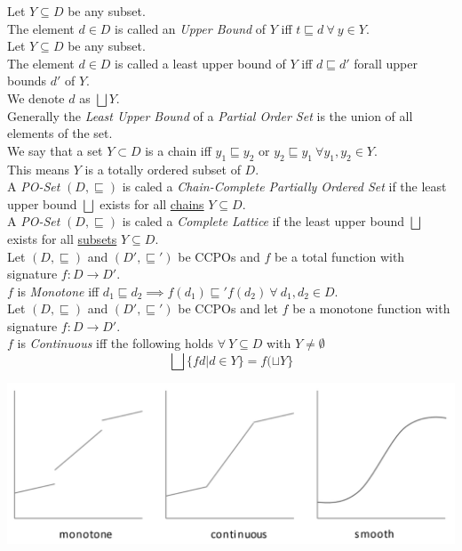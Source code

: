 \documentclass[11pt,a4paper]{article}
\begin{document}
Let $Y\subseteq D$ be any subset.\\
The element $d\in D$ is called an \textit{Upper Bound} of $Y$ iff $t\sqsubseteq d\ \forall\ y\in Y$.\\

Let $Y\subseteq D$ be any subset.\\
The element $d\in D$ is called a least upper bound of $Y$ iff $d\sqsubseteq d'$ forall upper bounds $d'$ of $Y$.\\
\nb We denote $d$ as $\bigsqcup Y$.\\

Generally the \textit{Least Upper Bound} of a \textit{Partial Order Set} is the union of all elements of the set.\\

We say that a set $Y\subset D$ is a chain iff $y_1\sqsubseteq y_2$ or $y_2\sqsubseteq y_1\ \forall y_1,y_2\in Y$.\\
This means $Y$ is a totally ordered subset of $D$.\\

A \textit{PO-Set} $(D,\sqsubseteq)$ is caled a \textit{Chain-Complete Partially Ordered Set} if the least upper bound $\bigsqcup$ exists for all \underline{chains} $Y\subseteq D$.\\

A \textit{PO-Set} $(D,\sqsubseteq)$ is caled a \textit{Complete Lattice} if the least upper bound $\bigsqcup$ exists for all \underline{subsets} $Y\subseteq D$.\\

Let $(D,\sqsubseteq)$ and $(D',\sqsubseteq')$ be CCPOs and $f$ be a total function with signature $f:D\to D'$.\\
$f$ is \textit{Monotone} iff $d_1 \sqsubseteq d_2\implies f (d_1)\sqsubseteq' f (d_2)\ \forall\ d_1,d_2\in D$.\\

Let $(D,\sqsubseteq)$ and $(D',\sqsubseteq')$ be CCPOs and let $f$ be a monotone function with signature $f:D\to D'$.\\
$f$ is \textit{Continuous} iff the following holds $\forall\ Y\subseteq D$ with $Y\neq\emptyset$
$$\bigsqcup\{f d|d\in Y\}=f(\sqcup Y\}$$

\includegraphics[scale=0.3]{img/intuitionForFunctions.png}
\end{document}
